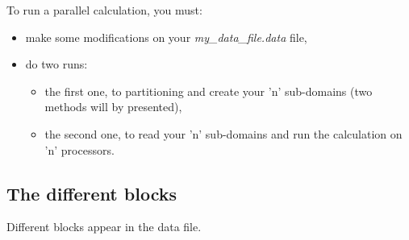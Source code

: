 To run a parallel calculation, you must:
\begin{itemize}
\item make some modifications on your \textit{my\_data\_file.data} file,
\item do two runs:
    \begin{itemize}
    \item the first one, to partitioning and create your 'n' sub-domains (two methods will by presented),
    \item the second one, to read your 'n' sub-domains and run the calculation on 'n' processors.
    \end{itemize}
\end{itemize}



\subsection{The different blocks}
Different blocks appear in the data file.

